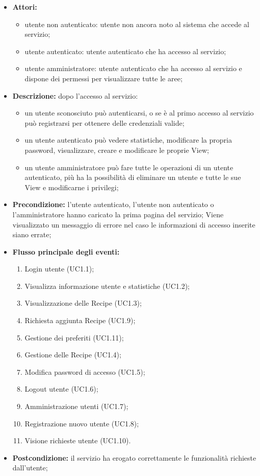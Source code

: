 \begin{itemize}
	\item \textbf{Attori:}
	\begin{itemize}
		\item utente non autenticato: utente non ancora noto al sistema che accede al servizio;
		\item utente autenticato: utente autenticato che ha accesso al servizio;
		\item utente amministratore: utente autenticato che ha accesso al servizio e dispone dei permessi per visualizzare tutte le aree;
	\end{itemize}
	\item \textbf{Descrizione:} dopo l'accesso al servizio:
	\begin{itemize}
		\item un utente sconosciuto può autenticarsi, o se è al primo accesso al servizio può registrarsi per ottenere delle credenziali valide;
		\item un utente autenticato può vedere statistiche, modificare la propria password, visualizzare, creare e modificare le proprie View;
		\item un utente amministratore può fare tutte le operazioni di un utente autenticato, più ha la possibilità di eliminare un utente e tutte le sue View e modificarne i privilegi;
	\end{itemize}
	\item \textbf{Precondizione:} l'utente autenticato, l'utente non autenticato o l'amministratore hanno caricato la prima pagina del servizio;
	Viene visualizzato un messaggio di errore nel caso le informazioni di accesso inserite siano errate;
	\item \textbf{Flusso principale degli eventi:}
	\begin{enumerate}
		\item Login utente (UC1.1);
		\item Visualizza informazione utente e statistiche (UC1.2);
		\item Visualizzazione delle Recipe (UC1.3);
		\item Richiesta aggiunta Recipe (UC1.9);
		\item Gestione dei preferiti (UC1.11);
		\item Gestione delle Recipe (UC1.4);
		\item Modifica password di accesso (UC1.5);
		\item Logout utente (UC1.6);
		\item Amministrazione utenti (UC1.7);
		\item Registrazione nuovo utente (UC1.8);
		\item Visione richieste utente (UC1.10).
	\end{enumerate}
	\item \textbf{Postcondizione:} il servizio ha erogato correttamente le funzionalità richieste dall'utente;
\end{itemize}

